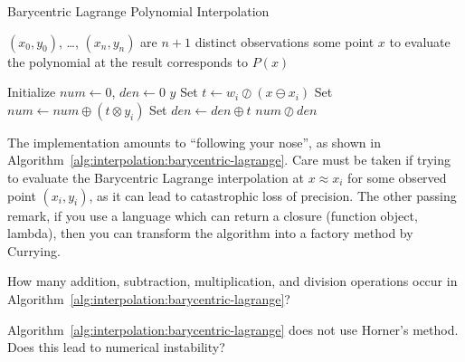 \begin{algorithm}\label{alg:interpolation:barycentric-lagrange}
  \caption{Barycentric Lagrange Polynomial Interpolation}
  \begin{algorithmic}[1]
    \Require $(x_{0},y_{0})$, \dots, $(x_{n},y_{n})$ are $n+1$ distinct observations
    \Require some point $x$ to evaluate the polynomial at
    \Ensure the result corresponds to $P(x)$

    \State Initialize $num\gets 0$, $den\gets 0$
      \State\Return $y$
      \Else
      \State Set $t \gets w_{i}\oslash(x \ominus x_{i})$
      \State Set $num\gets num \oplus (t\otimes y_{i})$
      \State Set $den\gets den\oplus t$
      \EndIf
    \EndFor
    \State\Return $num\oslash den$
    \EndFunction
  \end{algorithmic}
\end{algorithm}

The implementation amounts to ``following your nose'', as shown in
Algorithm~\ref{alg:interpolation:barycentric-lagrange}. Care must be
taken if trying to evaluate the Barycentric Lagrange interpolation at
$x\approx x_{i}$ for some observed point $(x_{i},y_{i})$, as it can lead
to catastrophic loss of precision. The other passing remark, if you use
a language which can return a closure (function object, lambda), then
you can transform the algorithm into a factory method by Currying.

\begin{xca}
  How many addition, subtraction, multiplication, and division
  operations occur in Algorithm~\ref{alg:interpolation:barycentric-lagrange}?
\end{xca}

\begin{xca}
  Algorithm~\ref{alg:interpolation:barycentric-lagrange} does not use
  Horner's method. Does this lead to numerical instability?
\end{xca}

